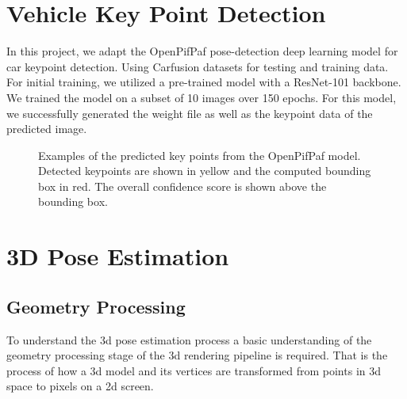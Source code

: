 \documentclass[conference]{IEEEtran}
\begin{document}
\section{Vehicle Key Point Detection}

In this project, we adapt the OpenPifPaf pose-detection deep learning model for car keypoint detection. Using Carfusion datasets for testing and training data. For initial training, we utilized a pre-trained model with a ResNet-101 backbone. We trained the model on a subset of 10 images over 150 epochs. For this model, we successfully generated the weight file as well as the keypoint data of the predicted image.

\begin{figure}[h]
    \centering
    \caption{Examples of the predicted key points from the OpenPifPaf model. Detected keypoints are shown in yellow and the computed bounding box in red. The overall confidence score is shown above the bounding box.}
    \label{img:keypoints}
\end{figure}

\section{3D Pose Estimation}

\subsection{Geometry Processing}

To understand the 3d pose estimation process a basic understanding of the geometry processing stage of the 3d rendering pipeline is required. That is the process of how a 3d model and its vertices are transformed from points in 3d space to pixels on a 2d screen.
\end{document}
